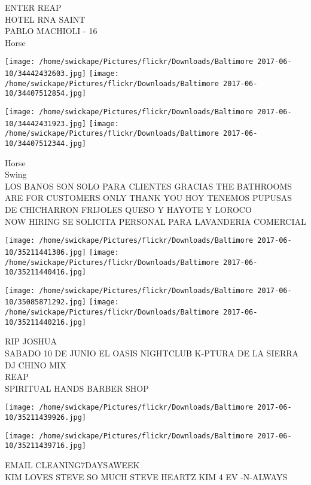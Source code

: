 \documentclass[10pt,letterpaper]{article}
\begin{document}
ENTER REAP\\
HOTEL RNA SAINT\\
PABLO MACHIOLI {-} 16\\
Horse\\
\pagebreak

\texttt{[image: /home/swickape/Pictures/flickr/Downloads/Baltimore 2017-06-10/34442432603.jpg]}
\texttt{[image: /home/swickape/Pictures/flickr/Downloads/Baltimore 2017-06-10/34407512854.jpg]}

\texttt{[image: /home/swickape/Pictures/flickr/Downloads/Baltimore 2017-06-10/34442431923.jpg]}
\texttt{[image: /home/swickape/Pictures/flickr/Downloads/Baltimore 2017-06-10/34407512344.jpg]}

Horse\\
Swing\\
LOS BANOS SON SOLO PARA CLIENTES GRACIAS THE BATHROOMS ARE FOR CUSTOMERS ONLY THANK YOU HOY TENEMOS PUPUSAS DE CHICHARRON FRIJOLES QUESO Y HAYOTE Y LOROCO\\
NOW HIRING SE SOLICITA PERSONAL PARA LAVANDERIA COMERCIAL\\
\pagebreak

\texttt{[image: /home/swickape/Pictures/flickr/Downloads/Baltimore 2017-06-10/35211441386.jpg]}
\texttt{[image: /home/swickape/Pictures/flickr/Downloads/Baltimore 2017-06-10/35211440416.jpg]}

\texttt{[image: /home/swickape/Pictures/flickr/Downloads/Baltimore 2017-06-10/35085871292.jpg]}
\texttt{[image: /home/swickape/Pictures/flickr/Downloads/Baltimore 2017-06-10/35211440216.jpg]}

RIP JOSHUA\\
SABADO 10 DE JUNIO EL OASIS NIGHTCLUB K{-}PTURA DE LA SIERRA DJ CHINO MIX\\
REAP\\
SPIRITUAL HANDS BARBER SHOP\\
\pagebreak

\texttt{[image: /home/swickape/Pictures/flickr/Downloads/Baltimore 2017-06-10/35211439926.jpg]}

\vspace{0.25in}
\texttt{[image: /home/swickape/Pictures/flickr/Downloads/Baltimore 2017-06-10/35211439716.jpg]}

EMAIL CLEANING7DAYSAWEEK\\
KIM LOVES STEVE SO MUCH STEVE HEARTZ KIM 4 EV {-}N{-}ALWAYS\\
\pagebreak
\end{document}
